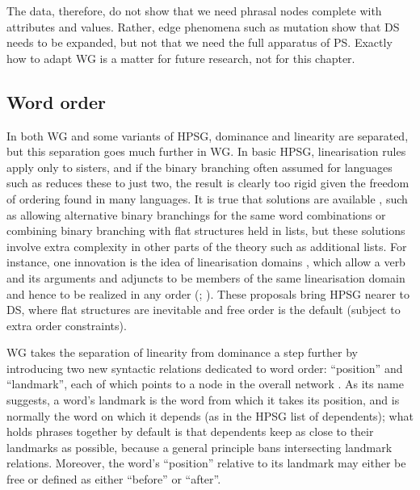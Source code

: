 \documentclass[output=paper,biblatex,babelshorthands,newtxmath,draftmode,colorlinks,citecolor=brown]{langscibook}
\begin{document}
The  data, therefore, do not show that we need phrasal nodes complete with attributes and
values. Rather, edge phenomena such as  mutation show that DS needs to be expanded, but
not that we need the full apparatus of PS. Exactly how to adapt WG is a matter for future research,
not for this chapter.


\subsection{Word order}
\label{sec:4.4}

In both WG and some variants of HPSG, dominance and linearity are separated, but this separation
goes much further in WG. In basic HPSG, linearisation rules apply only to sisters, and if the binary
branching often assumed for languages such as  \citep[Section~10.3]{MuellerGT-Eng2}
reduces these to just two, the result is clearly too rigid given the freedom of ordering found in
many languages. It is true that solutions are available \citep[Chapter~10]{MuellerGT-Eng2}, such as
allowing alternative binary branchings for the same word combinations  or combining binary branching
with flat structures held in lists, but these solutions involve extra complexity in other parts of
the theory such as additional lists. For instance, one innovation is the idea of linearisation
domains \citep{Reape94a,Kathol2000a,Babel}, which allow a verb and its arguments and adjuncts to be
members of the same linearisation domain and hence to be realized in any order
(\citealt[302]{MuellerGT-Eng2}; ). These
proposals bring HPSG nearer to DS, where flat structures are inevitable and free order is the
default (subject to extra order constraints).

WG takes the separation of linearity from dominance a step further by introducing two new syntactic
relations dedicated to word order: ``position'' and ``landmark'', each of which points to a node in
the overall network \citep{Hudson2018a}. As its name suggests, a word's landmark is the word from
which it takes its position, and is normally the word on which it depends (as in the HPSG list of
dependents); what holds phrases together by default is that dependents keep as close to their
landmarks as possible, because a general principle bans intersecting landmark relations. Moreover,
the word's ``position'' relative to its landmark may either be free or defined as either ``before''
or ``after''.
\end{document}
